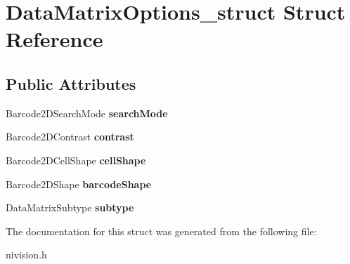 \hypertarget{structDataMatrixOptions__struct}{\section{\-Data\-Matrix\-Options\-\_\-struct \-Struct \-Reference}
\label{structDataMatrixOptions__struct}
}
\subsection*{\-Public \-Attributes}
\begin{DoxyCompactItemize}
\item 
\hypertarget{structDataMatrixOptions__struct_a876b0bb1832b6ccb9947c65f9581cdcf}{\-Barcode2\-D\-Search\-Mode {\bfseries search\-Mode}}\label{structDataMatrixOptions__struct_a876b0bb1832b6ccb9947c65f9581cdcf}

\item 
\hypertarget{structDataMatrixOptions__struct_aa9b7ca3f7c012279a65162df5d052c95}{\-Barcode2\-D\-Contrast {\bfseries contrast}}\label{structDataMatrixOptions__struct_aa9b7ca3f7c012279a65162df5d052c95}

\item 
\hypertarget{structDataMatrixOptions__struct_af11da0c095a44f46626529e53e35c27c}{\-Barcode2\-D\-Cell\-Shape {\bfseries cell\-Shape}}\label{structDataMatrixOptions__struct_af11da0c095a44f46626529e53e35c27c}

\item 
\hypertarget{structDataMatrixOptions__struct_ac70f307193d24dbe662ea8e6586d4e3b}{\-Barcode2\-D\-Shape {\bfseries barcode\-Shape}}\label{structDataMatrixOptions__struct_ac70f307193d24dbe662ea8e6586d4e3b}

\item 
\hypertarget{structDataMatrixOptions__struct_a48aba1ef2452faaef1725621fa265112}{\-Data\-Matrix\-Subtype {\bfseries subtype}}\label{structDataMatrixOptions__struct_a48aba1ef2452faaef1725621fa265112}

\end{DoxyCompactItemize}


\-The documentation for this struct was generated from the following file\-:\begin{DoxyCompactItemize}
\item 
nivision.\-h\end{DoxyCompactItemize}
